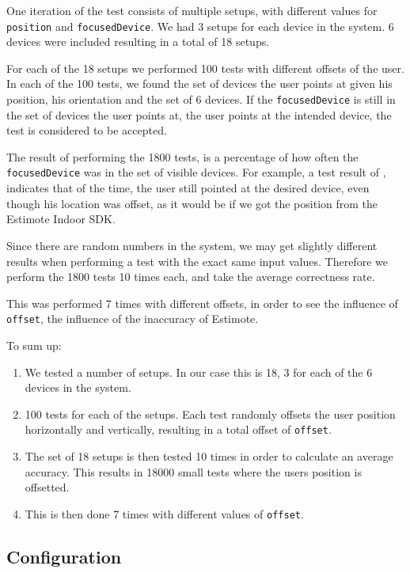 One iteration of the test consists of multiple setups, 
with different values for \texttt{position} and \texttt{focusedDevice}. 
We had \num{3} setups for each device in the system. 
\num{6} devices were included resulting in a total of \num{18} setups.

For each of the \num{18} setups we performed \num{100} tests with different offsets of the user. 
In each of the \num{100} tests, 
we found the set of devices the user points at given his position, 
his orientation and the set of \num{6} devices. 
If the \texttt{focusedDevice} is still in the set of devices the user points at, 
\ie the user points at the intended device,
the test is considered to be accepted. 

The result of performing the \num{1800} tests, 
is a percentage of how often the \texttt{focusedDevice} was in the set of visible devices. 
For example, a test result of , 
indicates that  of the time, 
the user still pointed at the desired device, 
even though his location was offset, 
as it would be if we got the position from the Estimote Indoor SDK.

Since there are random numbers in the system, 
we may get slightly different results when performing a test with the exact same input values. 
Therefore we perform the \num{1800} tests \num{10} times each, 
and take the average correctness rate.

This was performed \num{7} times with different offsets, 
in order to see the influence of \texttt{offset},
\ie the influence of the inaccuracy of Estimote.

To sum up:
\begin{enumerate}
\item We tested a number of setups. In our case this is \num{18}, \num{3} for each of the \num{6} devices in the system.
\item \num{100} tests for each of the setups. Each test randomly offsets the user position horizontally and vertically, resulting in a total offset of \texttt{offset}.
\item The set of \num{18} setups is then tested \num{10} times in order to calculate an average accuracy. This results in \num{18000} small tests where the users position is offsetted.
\item This is then done \num{7} times with different values of \texttt{offset}.
\end{enumerate}

\subsection{Configuration}

